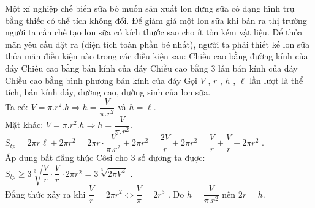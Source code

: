 \begin{ex}%
	Một xí nghiệp chế biến sữa bò muốn sản xuất lon đựng sữa có dạng hình trụ bằng thiếc có thể tích không đổi. Để giảm giá một lon sữa khi bán ra thị trường người ta cần chế tạo lon sữa có kích thước sao cho ít tốn kém vật liệu. Để thỏa mãn yêu cầu đặt ra (diện tích toàn phần bé nhất), người ta phải thiết kế lon sữa thỏa mãn điều kiện nào trong các điều kiện sau:
	\choice
	{\True Chiều cao bằng đường kính của đáy}
	{Chiều cao bằng bán kính của đáy}
	{Chiều cao bằng 3 lần bán kính của đáy}
	{Chiều cao bằng bình phương bán kính của đáy}
	\loigiai
	{
		Gọi $V$ , $r$ , $h$ , $\ell$ lần lượt là thể tích, bán kính đáy, đường cao, đường sinh của lon sữa.\\
		Ta có: $V=\pi .r^2.h\Rightarrow h=\dfrac{V}{\pi .r^2}$ và $h=\ell$.\\
		Mặt khác: $V=\pi .r^2.h\Rightarrow h=\dfrac{V}{\pi .r^2}$.\\
		$S_{tp}=2\pi r\ell+2\pi{r^2}=2\pi r\cdot\dfrac{V}{\pi .r^2}+2\pi{r^2}=\dfrac{2V}{r}+2\pi{r^2}=\dfrac{V}{r}+\dfrac{V}{r}+2\pi{r^2}$ .\\
		Áp dụng bất đẳng thức Côsi cho 3 số dương ta được:\\
		$S_{tp}\ge 3\sqrt[3]{\dfrac{V}{r}\cdot\dfrac{V}{r}\cdot 2\pi{r^2}}=3\sqrt[3]{2\pi{V^2}}$ .\\
		Đẳng thức xảy ra khi $\dfrac{V}{r}=2\pi{r^2}\Leftrightarrow\dfrac{V}{\pi}=2r^3$ . Do $h=\dfrac{V}{\pi .r^2}$ nên $2r=h$.}
\end{ex}
